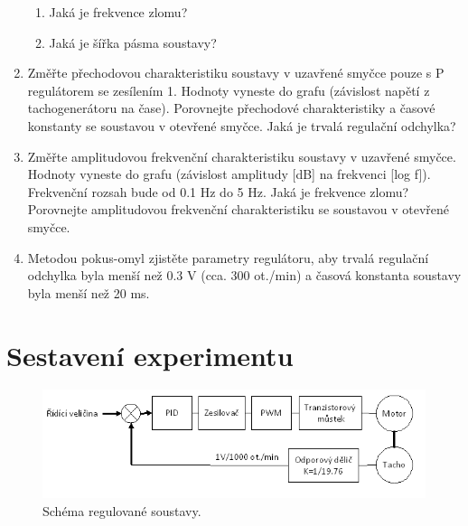 \begin{enumerate}
\begin{enumerate}
	\item Jaká je frekvence zlomu?
	\item Jaká je šířka pásma soustavy?
\end{enumerate}
\item Změřte přechodovou charakteristiku soustavy v uzavřené smyčce pouze s P regulátorem se zesílením 1. Hodnoty vyneste do grafu (závislost napětí z tachogenerátoru na čase). Porovnejte přechodové charakteristiky a časové konstanty se soustavou v otevřené smyčce. Jaká je trvalá regulační odchylka?
\item Změřte amplitudovou frekvenční charakteristiku soustavy v uzavřené smyčce. Hodnoty vyneste do grafu (závislost amplitudy [dB] na frekvenci [log f]). Frekvenční rozsah bude od 0.1 Hz do 5 Hz. Jaká je frekvence zlomu? Porovnejte amplitudovou frekvenční charakteristiku se soustavou v otevřené smyčce.
\item Metodou pokus-omyl zjistěte parametry regulátoru, aby trvalá regulační odchylka byla menší než 0.3 V (cca. 300 ot./min) a časová konstanta soustavy byla menší než 20 ms.
\end{enumerate}



\section{Sestavení experimentu}

\begin{figure}[!hbt] %
	\centering
	\includegraphics[]{img/schema_regulovane_soustavy.png} %
	\caption{Schéma regulované soustavy.} %
	\label{fig:schema_reg} %
\end{figure}	

